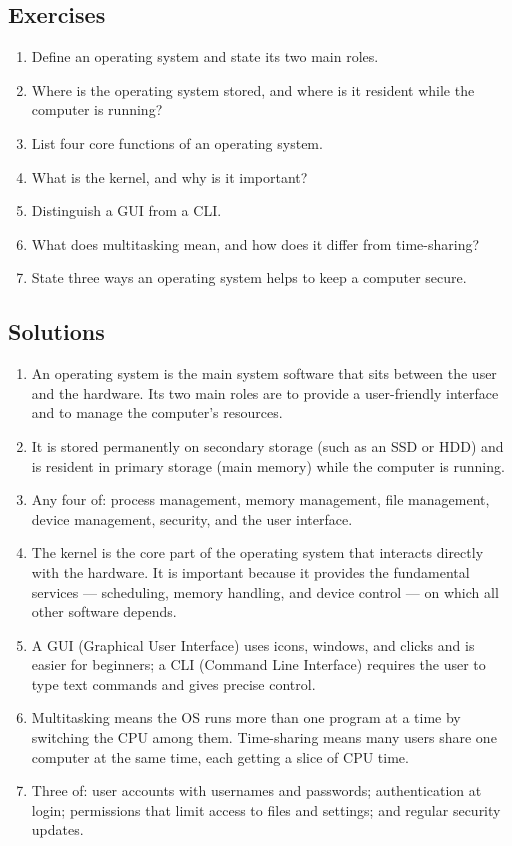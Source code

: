 \documentclass[11pt]{article}
\begin{document}
\subsection*{Exercises}
\begin{enumerate}[label=\arabic*.]
  \item Define an operating system and state its two main roles.
  \item Where is the operating system stored, and where is it resident while
    the computer is running?
  \item List four core functions of an operating system.
  \item What is the kernel, and why is it important?
  \item Distinguish a GUI from a CLI.
  \item What does multitasking mean, and how does it differ from
    time-sharing?
  \item State three ways an operating system helps to keep a computer secure.
\end{enumerate}

\subsection*{Solutions}
\begingroup\small
\begin{enumerate}[label=\arabic*.]
  \item An operating system is the main system software that sits between the
    user and the hardware. Its two main roles are to provide a user-friendly
    interface and to manage the computer's resources.
  \item It is stored permanently on secondary storage (such as an SSD or HDD)
    and is resident in primary storage (main memory) while the computer is
    running.
  \item Any four of: process management, memory management, file management,
    device management, security, and the user interface.
  \item The kernel is the core part of the operating system that interacts
    directly with the hardware. It is important because it provides the
    fundamental services --- scheduling, memory handling, and device control
    --- on which all other software depends.
  \item A GUI (Graphical User Interface) uses icons, windows, and clicks and is
    easier for beginners; a CLI (Command Line Interface) requires the user to
    type text commands and gives precise control.
  \item Multitasking means the OS runs more than one program at a time by
    switching the CPU among them. Time-sharing means many users share one
    computer at the same time, each getting a slice of CPU time.
  \item Three of: user accounts with usernames and passwords; authentication at
    login; permissions that limit access to files and settings; and regular
    security updates.
\end{enumerate}
\endgroup
\end{document}
